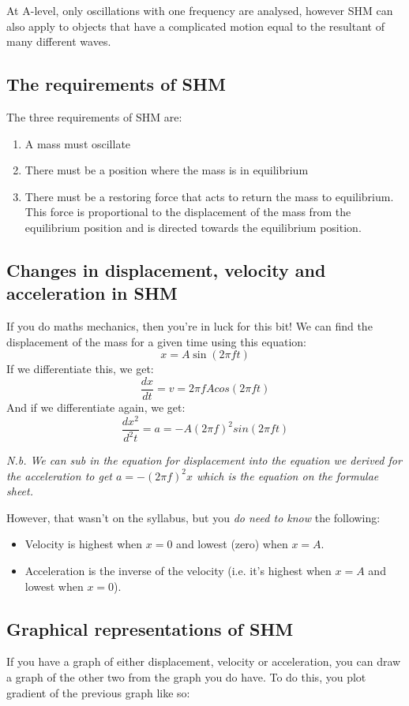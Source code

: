 \documentclass{article}
\begin{document}
At A-level, only oscillations with one frequency are analysed, however SHM can
also apply to objects that have a complicated motion equal to the resultant of
many different waves.

\subsection*{The requirements of SHM}
The three requirements of SHM are:
\begin{enumerate}
	\item A mass must oscillate
	\item There must be a position where the mass is in equilibrium
	\item There must be a restoring force that acts to return the mass to
	equilibrium. This force is proportional to the displacement of the mass from
	the equilibrium position and is directed towards the equilibrium position.
\end{enumerate}

\subsection*{Changes in displacement, velocity and acceleration in SHM}
If you do maths mechanics, then you're in luck for this bit!
We can find the displacement of the mass for a given time using this equation:
\[
	x = A\sin (2 \pi ft)
\]
If we differentiate this, we get:
\[
	\frac{dx}{dt} = v = 2 \pi f A cos(2 \pi f t)
\]
And if we differentiate again, we get:
\[
	\frac{dx^2}{d^2t} = a = - A (2 \pi f)^2 sin(2 \pi f t)
\]

\textit{N.b. We can sub in the equation for displacement into the equation we
derived for the acceleration to get $a= -(2 \pi f)^2 x$ which is the equation on
the formulae sheet.}

However, that wasn't on the syllabus, but you \textit{do need to know} the
following:
\begin{itemize}
	\item Velocity is highest when $x=0$ and lowest (zero) when $x=A$.
	\item Acceleration is the inverse of the velocity (i.e. it's highest when
		$x=A$ and lowest when $x=0$).
\end{itemize}

\subsection*{Graphical representations of SHM}
If you have a graph of either displacement, velocity or acceleration, you can
draw a graph of the other two from the graph you do have. To do this, you plot
gradient of the previous graph like so:
\end{document}
